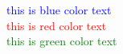 \documentclass{article}
\begin{document}
    	\textcolor{blue}{this is blue color text}\\
    	\textcolor{red}{this is red color text}\\
    	\textcolor{green}{this is green color text}\\
    	
    	
    
\end{document}
